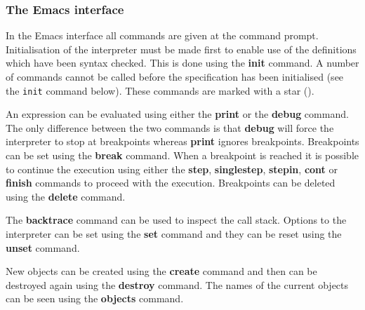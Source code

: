 \documentclass[\pformat,12pt]{article}
\newcommand{\cmd}{\tt }
\begin{document}
\subsubsection{The Emacs interface}

In the Emacs interface all commands are given at the command
prompt. Initialisation of the interpreter must be made first to enable
use of the definitions which have been syntax checked. This is done
using the \textbf{init} command. A number of commands cannot be
called before the specification has 
been initialised (see the {\cmd init} command below).  These commands
are marked with a star ({\tt *}).

An expression can be evaluated using
either the \textbf{print} or the \textbf{debug} command.  The only
difference between the two commands is that {\bf debug} will force
the interpreter to stop at breakpoints whereas {\bf print} ignores
breakpoints. Breakpoints can be set using
the \textbf{break} command. When a breakpoint is reached it is
possible to continue the execution using either the \textbf{step},
\textbf{singlestep}, \textbf{stepin}, \textbf{cont} or \textbf{finish}
commands to
proceed with the execution. Breakpoints can be deleted using the
\textbf{delete} command.

The \textbf{backtrace} command can be used to inspect the call stack.
Options to the interpreter can be set using the \textbf{set} command
and they can be reset using the \textbf{unset} command.

New objects can be created using the \textbf{create} command and then
can be destroyed again using the \textbf{destroy} command. The names
of the current objects can be seen using the \textbf{objects} command.
\end{document}
